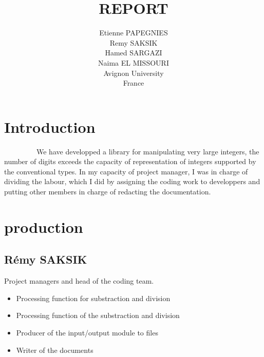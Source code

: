 \documentclass[11pt]{report}
\begin{document}
    \title{REPORT}
    \author { 
    Etienne PAPEGNIES\\
    Remy SAKSIK\\
    Hamed SARGAZI\\
    Naima EL MISSOURI\\
    Avignon University\\
    France\\
}
   \maketitle

\setcounter{secnumdepth}{1}



    \tableofcontents
    
   \chapter*{Introduction}  
   
~~~~~~~~~We have developped a library for manipulating very large integers, the number of digits exceeds the capacity of
representation of integers supported by the conventional types.
In my capacity of project manager, I was in charge of dividing the labour, which I did by assigning the coding work
to developpers and putting other members in charge of redacting the documentation. 
   
    \chapter*{production}  
   \section{R\'{e}my SAKSIK}

   Project managers and head of the coding team.
        \begin{itemize}
            \item Processing function for substraction and division
            \item Processing function of the substraction and division
            \item Producer of the input/output module to files
            \item Writer of the documents

        \end{itemize}
\end{document}
